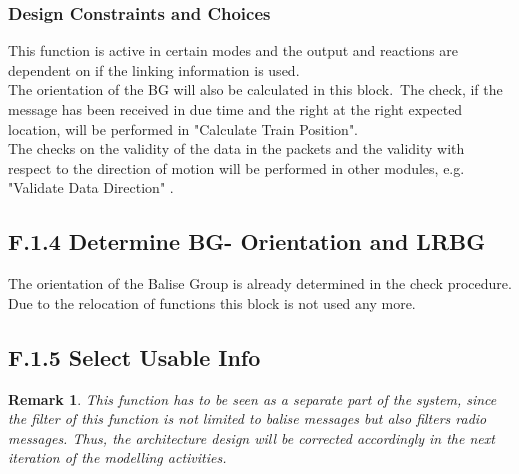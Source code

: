 \documentclass{template/openetcs_report}
\newtheorem{remark}{Remark}
\begin{document}
\subsubsection{Design Constraints and Choices}

This function is active in certain modes and the output and reactions are dependent on if the linking information is used.\\
The orientation of the BG will also be calculated in this block.\
The check, if the message has been received in due time and the right at the right expected location, will be performed in "Calculate Train Position".\\
The checks on the validity of the data in the packets and the validity with respect to the direction of motion will be performed in other modules, e.g. "Validate Data Direction" .\\


\subsection{F.1.4 Determine BG- Orientation and LRBG}

The orientation of the Balise Group is already determined in the check procedure. Due to the relocation of functions this block is not used any more.


\subsection{F.1.5 Select Usable Info}
\begin{remark}
This function has to be seen as a separate part of the system, since the filter of this function is not limited to balise messages but also filters radio messages. Thus, the architecture design will be corrected accordingly in the next iteration of the modelling activities.
\end{remark}
\end{document}
